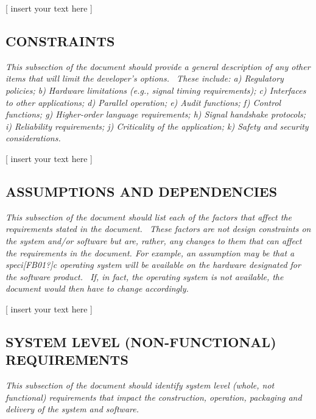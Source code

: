 \documentclass[twoside,letterpaper]{article}
\begin{document}
{\color{black}
[ insert your text here ]}

\subsection[CONSTRAINTS]{\rmfamily\bfseries\color{black}
CONSTRAINTS}
{\itshape\color{black}
This subsection of the document should provide a general description of
any other items that will limit the developer{\textquoteright}s
options. \ These include: a) Regulatory policies; b) Hardware
limitations (e.g., signal timing requirements); c) Interfaces to other
applications; d) Parallel operation; e) Audit functions; f) Control
functions; g) Higher-order language requirements; h) Signal handshake
protocols; i) Reliability requirements; j) Criticality of the
application; k) Safety and security considerations.}

{\color{black}
[ insert your text here ]}

\subsection[ASSUMPTIONS AND
DEPENDENCIES]{\rmfamily\bfseries\color{black}
ASSUMPTIONS AND DEPENDENCIES}
{\itshape\color{black}
This subsection of the document should list each of the factors that
affect the requirements stated in the document. \ These factors are not
design constraints on the system and/or software but are, rather, any
changes to them that can affect the requirements in the document. For
example, an assumption may be that a speci[FB01?]c operating system
will be available on the hardware designated for the software product.
\ If, in fact, the operating system is not available, the document
would then have to change accordingly.}

{\color{black}
[ insert your text here ]}

\subsection[SYSTEM LEVEL (NON{}-FUNCTIONAL)
REQUIREMENTS]{\rmfamily\bfseries\color{black}
SYSTEM LEVEL (NON-FUNCTIONAL) REQUIREMENTS}
{\itshape\color{black}
This subsection of the document should identify system level (whole, not
functional) requirements that impact the construction, operation,
packaging and delivery of the system and software.}
\end{document}
